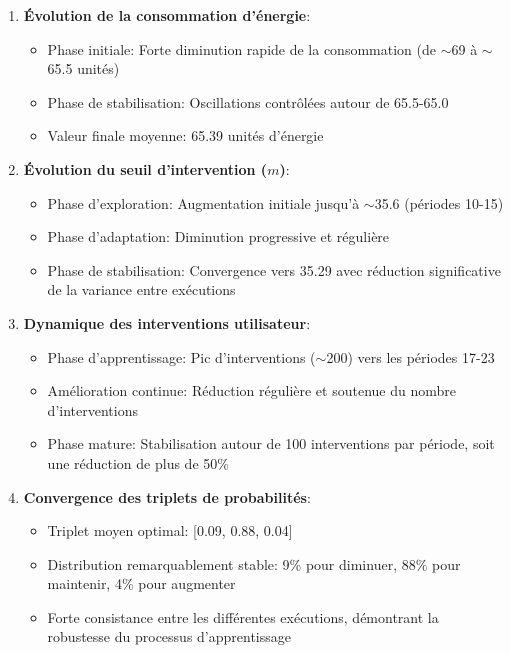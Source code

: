 \documentclass[a4paper,11pt]{article}
\begin{document}
\begin{enumerate}
    \item \textbf{Évolution de la consommation d'énergie}:
    \begin{itemize}
        \item Phase initiale: Forte diminution rapide de la consommation (de $\sim$69 à $\sim$65.5 unités)
        \item Phase de stabilisation: Oscillations contrôlées autour de 65.5-65.0
        \item Valeur finale moyenne: 65.39 unités d'énergie
    \end{itemize}
    
    \item \textbf{Évolution du seuil d'intervention ($m$)}:
    \begin{itemize}
        \item Phase d'exploration: Augmentation initiale jusqu'à $\sim$35.6 (périodes 10-15)
        \item Phase d'adaptation: Diminution progressive et régulière
        \item Phase de stabilisation: Convergence vers 35.29 avec réduction significative de la variance entre exécutions
    \end{itemize}
    
    \item \textbf{Dynamique des interventions utilisateur}:
    \begin{itemize}
        \item Phase d'apprentissage: Pic d'interventions ($\sim$200) vers les périodes 17-23
        \item Amélioration continue: Réduction régulière et soutenue du nombre d'interventions
        \item Phase mature: Stabilisation autour de 100 interventions par période, soit une réduction de plus de 50\% 
    \end{itemize}
    
    \item \textbf{Convergence des triplets de probabilités}:
    \begin{itemize}
        \item Triplet moyen optimal: [0.09, 0.88, 0.04]
        \item Distribution remarquablement stable: 9\% pour diminuer, 88\% pour maintenir, 4\% pour augmenter
        \item Forte consistance entre les différentes exécutions, démontrant la robustesse du processus d'apprentissage
    \end{itemize}
\end{enumerate}
\end{document}
